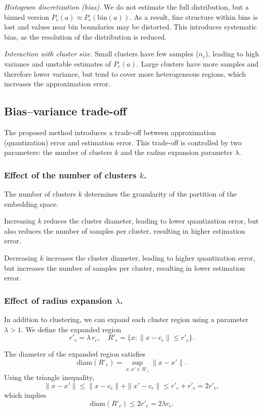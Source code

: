 \emph{Histogram discretization (bias).}
We do not estimate the full distribution, but a binned version
\(P_c(a) \approx P_c(\text{bin}(a))\).
As a result, fine structure within bins is lost and values near bin boundaries
may be distorted. This introduces systematic bias, as the resolution of the
distribution is reduced.

\emph{Interaction with cluster size.}
Small clusters have few samples (\(n_c\)), leading to high variance and unstable
estimates of \(P_c(a)\). Large clusters have more samples and therefore lower
variance, but tend to cover more heterogeneous regions, which increases the
approximation error.

\subsection{Bias--variance trade-off}

The proposed method introduces a trade-off between approximation
(quantization) error and estimation error. This trade-off is controlled by two
parameters: the number of clusters \(k\) and the radius expansion parameter
\(\lambda\).

\subsubsection{Effect of the number of clusters \(k\).}

The number of clusters \(k\) determines the granularity of the partition of the
embedding space.

Increasing \(k\) reduces the cluster diameter, leading to lower quantization
error, but also reduces the number of samples per cluster, resulting in higher
estimation error.

Decreasing \(k\) increases the cluster diameter, leading to higher
quantization error, but increases the number of samples per cluster, resulting
in lower estimation error.

\subsubsection{Effect of radius expansion \(\lambda\).}\label{subsec:radius-expansion}

In addition to clustering, we can expand each cluster region using a parameter
\(\lambda > 1\). We define the expanded region
\[
r'_c = \lambda \, r_c, \quad
R'_c = \{ x : \|x - c_c\| \le r'_c \}.
\]

The diameter of the expanded region satisfies
\[
\mathrm{diam}(R'_c) = \sup_{x,x' \in R'_c} \|x - x'\|.
\]
Using the triangle inequality,
\[
\|x - x'\| \le \|x - c_c\| + \|x' - c_c\| \le r'_c + r'_c = 2r'_c,
\]
which implies
\[
\mathrm{diam}(R'_c) \le 2 r'_c = 2 \lambda r_c.
\]

